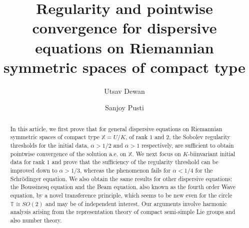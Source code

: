 \documentclass[12pt]{amsart}
\theoremstyle{definition}
\numberwithin{equation}{section}
\begin{document}
\title[Regularity and pointwise convergence]{Regularity and pointwise convergence for dispersive equations on Riemannian symmetric spaces of compact type }

\author[U. Dewan]{Utsav Dewan}
\address{Department of Mathematics, Indian Institute of Technology Bombay, Powai, Mumbai-400076, India}

\author[S. Pusti]{Sanjoy Pusti}
\address{Department of Mathematics, Indian Institute of Technology Bombay, Powai, Mumbai-400076, India}



\begin{abstract}
In this article, we first prove that for general dispersive equations on Riemannian symmetric spaces of compact type $\mathbb{X}=U/K$, of rank $1$ and $2$, the Sobolev regularity thresholds for the initial data, $\alpha >1/2$ and $\alpha >1$ respectively, are sufficient to obtain pointwise convergence of the solution a.e. on $\mathbb{X}$. We next focus on $K$-biinvariant initial data for rank $1$ and prove that the sufficiency of the regularity threshold can be improved down to $\alpha>1/3$, whereas the phenomenon fails for $\alpha<1/4$ for the Schr\"odinger equation. We also obtain the same results for other dispersive equations: the Boussinesq equation and the Beam equation, also known as the fourth order Wave equation, by a novel transference principle, which seems to be new even for the circle $\mathbb{T} \cong SO(2)$ and may be of independent interest. Our arguments involve harmonic analysis arising from the representation theory of compact semi-simple Lie groups and also number theory.
\end{abstract}

\maketitle
\tableofcontents
\end{document}

